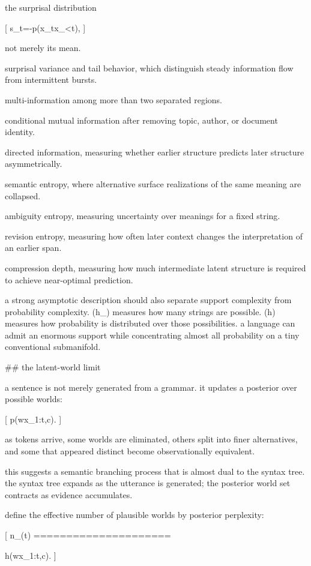 the surprisal distribution

[
s_t=-\log p(x_t\mid x_{<t}),
]

not merely its mean.

surprisal variance and tail behavior, which distinguish steady information flow from intermittent bursts.

multi-information among more than two separated regions.

conditional mutual information after removing topic, author, or document identity.

directed information, measuring whether earlier structure predicts later structure asymmetrically.

semantic entropy, where alternative surface realizations of the same meaning are collapsed.

ambiguity entropy, measuring uncertainty over meanings for a fixed string.

revision entropy, measuring how often later context changes the interpretation of an earlier span.

compression depth, measuring how much intermediate latent structure is required to achieve near-optimal prediction.

a strong asymptotic description should also separate support complexity from probability complexity. (h_{}) measures how many strings are possible. (h) measures how probability is distributed over those possibilities. a language can admit an enormous support while concentrating almost all probability on a tiny conventional submanifold.

## the latent-world limit

a sentence is not merely generated from a grammar. it updates a posterior over possible worlds:

[
p(w\mid x_{1:t},c).
]

as tokens arrive, some worlds are eliminated, others split into finer alternatives, and some that appeared distinct become observationally equivalent.

this suggests a semantic branching process that is almost dual to the syntax tree. the syntax tree expands as the utterance is generated; the posterior world set contracts as evidence accumulates.

define the effective number of plausible worlds by posterior perplexity:

[
n_{}(t)
=====================

\exp h(w\mid x_{1:t},c).
]

